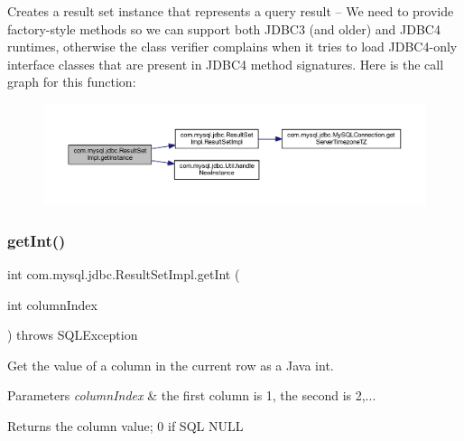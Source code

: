 Creates a result set instance that represents a query result -- We need to provide factory-\/style methods so we can support both J\+D\+B\+C3 (and older) and J\+D\+B\+C4 runtimes, otherwise the class verifier complains when it tries to load J\+D\+B\+C4-\/only interface classes that are present in J\+D\+B\+C4 method signatures. Here is the call graph for this function\+:
\nopagebreak
\begin{figure}[H]
\begin{center}
\leavevmode
\includegraphics[width=350pt]{classcom_1_1mysql_1_1jdbc_1_1_result_set_impl_a2b7230144634b4d3e651707a23fd5064_cgraph}
\end{center}
\end{figure}
\mbox{\label{classcom_1_1mysql_1_1jdbc_1_1_result_set_impl_a15131d50936eef4bd078f5471ee12c39}} 
\subsubsection{\texorpdfstring{get\+Int()}{getInt()}\hspace{0.1cm}{\footnotesize\ttfamily [1/2]}}
{\footnotesize\ttfamily int com.\+mysql.\+jdbc.\+Result\+Set\+Impl.\+get\+Int (\begin{DoxyParamCaption}\item[{int}]{column\+Index }\end{DoxyParamCaption}) throws S\+Q\+L\+Exception}

Get the value of a column in the current row as a Java int.


\begin{DoxyParams}{Parameters}
{\em column\+Index} & the first column is 1, the second is 2,...\\
\hline
\end{DoxyParams}
\begin{DoxyReturn}{Returns}
the column value; 0 if S\+QL N\+U\+LL
\end{DoxyReturn}

